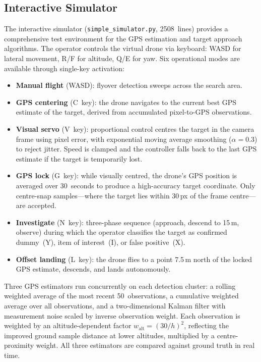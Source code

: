 \subsection{Interactive Simulator}\label{sec:sim-interactive}

The interactive simulator (\texttt{simple\_simulator.py}, 2508~lines) provides a comprehensive test environment for the GPS estimation and target approach algorithms. The operator controls the virtual drone via keyboard: WASD for lateral movement, R/F for altitude, Q/E for yaw. Six operational modes are available through single-key activation:

\begin{itemize}
    \item \textbf{Manual flight} (WASD): flyover detection sweeps across the search area.
    \item \textbf{GPS centering} (C~key): the drone navigates to the current best GPS estimate of the target, derived from accumulated pixel-to-GPS observations.
    \item \textbf{Visual servo} (V~key): proportional control centres the target in the camera frame using pixel error, with exponential moving average smoothing ($\alpha = 0.3$) to reject jitter. Speed is clamped and the controller falls back to the last GPS estimate if the target is temporarily lost.
    \item \textbf{GPS lock} (G~key): while visually centred, the drone's GPS position is averaged over 30~seconds to produce a high-accuracy target coordinate. Only centre-snap samples---where the target lies within 30\,px of the frame centre---are accepted.
    \item \textbf{Investigate} (N~key): three-phase sequence (approach, descend to 15\,m, observe) during which the operator classifies the target as confirmed dummy~(Y), item of interest~(I), or false positive~(X).
    \item \textbf{Offset landing} (L~key): the drone flies to a point 7.5\,m north of the locked GPS estimate, descends, and lands autonomously.
\end{itemize}

Three GPS estimators run concurrently on each detection cluster: a rolling weighted average of the most recent 50~observations, a cumulative weighted average over all observations, and a two-dimensional Kalman filter with measurement noise scaled by inverse observation weight. Each observation is weighted by an altitude-dependent factor $w_{\text{alt}} = (30/h)^2$, reflecting the improved ground sample distance at lower altitudes, multiplied by a centre-proximity weight. All three estimators are compared against ground truth in real time.

